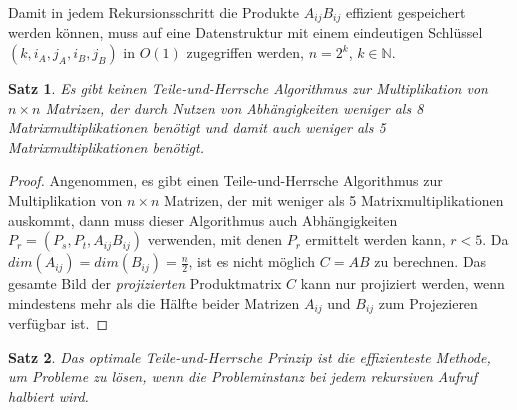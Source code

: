 \documentclass{report}
\newtheorem{satz}{Satz}[section]
\numberwithin{equation}{section}
\begin{document}
Damit in jedem Rekursionsschritt die Produkte $A_{ij}B_{ij}$ effizient gespeichert werden können, muss auf eine Datenstruktur mit einem eindeutigen Schlüssel $(k, i_{A}, j_{A}, i_{B}, j_{B})$ in $O(1)$ zugegriffen werden, $n = 2^k$, $k \in \mathbb{N}$.
\begin{satz}
	Es gibt keinen Teile-und-Herrsche Algorithmus zur Multiplikation von $n \times n$ Matrizen, der durch Nutzen von Abhängigkeiten weniger als 8 Matrixmultiplikationen benötigt und damit auch weniger als 5 Matrixmultiplikationen benötigt. 
\end{satz}
\begin{proof}
	Angenommen, es gibt einen Teile-und-Herrsche Algorithmus zur Multiplikation von $n \times n$ Matrizen, der mit weniger als 5 Matrixmultiplikationen auskommt, dann muss dieser Algorithmus auch Abhängigkeiten $P_r = (P_s, P_t, A_{ij}B_{ij})$ verwenden, mit denen $P_r$ ermittelt werden kann, $r < 5$. Da $dim(A_{ij}) = dim(B_{ij}) = \frac{n}{2}$, ist es nicht möglich $C = AB$ zu berechnen. Das gesamte Bild der \textit{projizierten} Produktmatrix $C$ kann nur projiziert werden, wenn mindestens mehr als die Hälfte beider Matrizen $A_{ij}$ und $B_{ij}$ zum Projezieren verfügbar ist.
\end{proof}
\begin{satz}
	Das optimale Teile-und-Herrsche Prinzip ist die effizienteste Methode, um Probleme zu lösen, wenn die Probleminstanz bei jedem rekursiven Aufruf halbiert wird. 
\end{satz}
\end{document}
